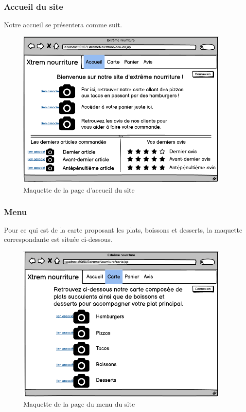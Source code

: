 \subsubsection{Accueil du site}
Notre accueil se présentera comme suit.
\begin{figure}[H]
\begin{centering}
\includegraphics[width=0.95\textwidth,height=0.6\textheight]{images/accueil.png}\caption{Maquette de la page d'accueil du site}
\par
\end{centering}
\end{figure}

\clearpage

\subsubsection{Menu}
Pour ce qui est de la carte proposant les plats, boissons et desserts, la maquette correspondante est située ci-dessous.
\begin{figure}[H]
\begin{centering}
\includegraphics[width=0.95\textwidth,height=0.6\textheight]{images/carte.png}
\caption{Maquette de la page du menu du site}
\par
\end{centering}
\end{figure}

